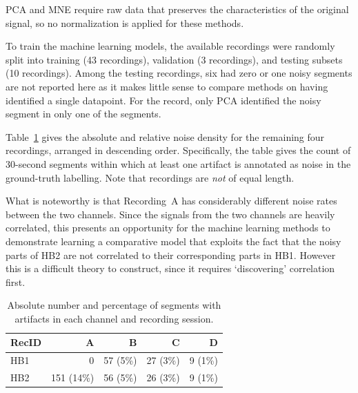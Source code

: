 \documentclass[conference]{IEEEtran}
\begin{document}



PCA and MNE require raw data that preserves the characteristics of the
original signal, so no normalization is applied for these methods.

To train the machine learning models, the available recordings were
randomly split into training (43 recordings), validation (3
recordings), and testing subsets (10 recordings). Among the testing
recordings, six had zero or one noisy segments are not reported here
as it makes little sense to compare methods on having identified a
single datapoint. For the record, only PCA identified the noisy
segment in only one of the segments.

Table~\ref{tab2} gives the absolute and relative noise density for the
remaining four recordings, arranged in descending order.
Specifically, the table gives the count of 30-second segments within
which at least one artifact is annotated as noise in the ground-truth
labelling. Note that recordings are \emph{not} of equal length.

What is noteworthy is that Recording~A has considerably different
noise rates between the two channels. Since the signals from the
two channels are heavily correlated, this presents an opportunity
for the machine learning methods to demonstrate learning a
comparative model that exploits the fact that the noisy parts of
HB2 are not correlated to their corresponding parts in HB1. However
this is a difficult theory to construct, since it requires
`discovering' correlation first.


\begin{table}[bt]
\caption{Absolute number and percentage of segments with artifacts in
  each channel and recording session.}
\centering
\renewcommand{\arraystretch}{1.3} %
\begin{tabular}{lrrrr}
\toprule
RecID &  A         &  B       &  C & D \\
\midrule
HB1   &   0        & 57 (5\%) & 27 (3\%) & 9 (1\%) \\

HB2   & 151 (14\%) & 56 (5\%) & 26 (3\%) & 9 (1\%) \\
\bottomrule
\end{tabular}
\label{tab2}
\end{table}
\end{document}
